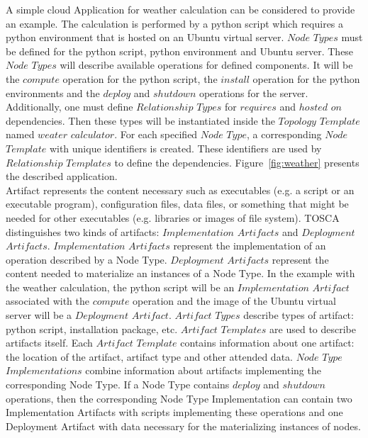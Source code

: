 A simple cloud Application for weather calculation can be considered to provide an example. 
The calculation is performed by a python script which requires a python environment that is hosted on an Ubuntu virtual server.
$Node$ $Types$ must be defined for the python script, python environment and Ubuntu server.  
These $Node$ $Types$ will describe available operations for defined components.
It will be the $compute$ operation for the python script, the $install$ operation for the python environments and the $deploy$ and $shutdown$ operations for the server.
Additionally, one must define $Relationship$ $Types$ for $requires$ and $hosted$ $on$ dependencies.
Then these types will be instantiated inside the $Topology$ $Template$ named $weater$ $calculator$.
For each specified $Node$ $Type$, a corresponding $Node$ $Template$ with unique identifiers is created.
These identifiers are used by $Relationship$ $Templates$ to define the dependencies.
Figure~\ref{fig:weather} presents the described application. \\
Artifact represents the content necessary such as executables (e.g. a script or an executable program), configuration files, data files, or something that might be needed for other executables (e.g. libraries or images of file system).
TOSCA distinguishes two kinds of artifacts: $Implementation$ $Artifacts$ and $Deployment$ $Artifacts$.
$Implementation$ $Artifacts$ represent the implementation of an operation described by a Node Type.
$Deployment$ $Artifacts$ represent the content needed to materialize an instances of a Node Type.
In the example with the weather calculation, the python script will be an $Implementation$ $Artifact$ associated with the $compute$ operation and the image of the Ubuntu virtual server will be a $Deployment$ $Artifact$.
$Artifact$ $Types$ describe types of artifact: python script, installation package, etc.
$Artifact$ $Templates$ are used to describe artifacts itself.
Each $Artifact$ $Template$ contains information about one artifact: the location of the artifact, artifact type and other attended data. 
$Node$ $Type$ $Implementations$ combine information about artifacts implementing the corresponding Node Type.
If a Node Type contains $deploy$ and $shutdown$ operations, then the corresponding Node Type Implementation can contain two Implementation Artifacts with scripts implementing these operations and one Deployment Artifact with data necessary for the materializing instances of nodes. %
